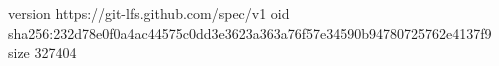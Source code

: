version https://git-lfs.github.com/spec/v1
oid sha256:232d78e0f0a4ac44575c0dd3e3623a363a76f57e34590b94780725762e4137f9
size 327404
